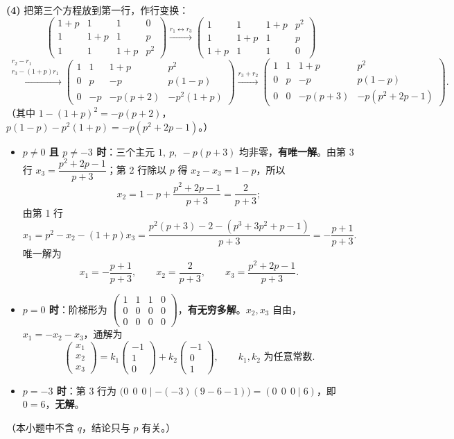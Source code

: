 \documentclass[11pt,a4paper]{ctexart}
\newcommand{\rt}[1]{\xrightarrow{#1}}
\begin{document}
\textbf{(4)} 把第三个方程放到第一行，作行变换：
\[
\left(\begin{array}{ccc|c}1+p&1&1&0\\1&1+p&1&p\\1&1&1+p&p^2\end{array}\right)
\rt{r_1\leftrightarrow r_3}
\left(\begin{array}{ccc|c}1&1&1+p&p^2\\1&1+p&1&p\\1+p&1&1&0\end{array}\right)
\]
\[
\rt{\substack{r_2-r_1\\ r_3-(1+p)r_1}}
\left(\begin{array}{ccc|c}1&1&1+p&p^2\\0&p&-p&p(1-p)\\0&-p&-p(p+2)&-p^2(1+p)\end{array}\right)
\rt{r_3+r_2}
\left(\begin{array}{ccc|c}1&1&1+p&p^2\\0&p&-p&p(1-p)\\0&0&-p(p+3)&-p(p^2+2p-1)\end{array}\right).
\]
（其中 $1-(1+p)^2=-p(p+2)$，$p(1-p)-p^2(1+p)=-p(p^2+2p-1)$。）
\begin{itemize}
  \item \textbf{$p\ne0$ 且 $p\ne-3$ 时}：三个主元 $1,\ p,\ -p(p+3)$ 均非零，\textbf{有唯一解}。由第 3 行 $x_3=\dfrac{p^2+2p-1}{p+3}$；第 2 行除以 $p$ 得 $x_2-x_3=1-p$，所以
  \[
  x_2=1-p+\frac{p^2+2p-1}{p+3}=\frac{2}{p+3};
  \]
  由第 1 行
  \[
  x_1=p^2-x_2-(1+p)x_3=\frac{p^2(p+3)-2-(p^3+3p^2+p-1)}{p+3}=-\frac{p+1}{p+3}.
  \]
  唯一解为
  \[
  x_1=-\frac{p+1}{p+3},\qquad x_2=\frac{2}{p+3},\qquad x_3=\frac{p^2+2p-1}{p+3}.
  \]
  \item \textbf{$p=0$ 时}：阶梯形为 $\left(\begin{array}{ccc|c}1&1&1&0\\0&0&0&0\\0&0&0&0\end{array}\right)$，\textbf{有无穷多解}。$x_2,x_3$ 自由，$x_1=-x_2-x_3$，通解为
  \[
  \begin{pmatrix}x_1\\x_2\\x_3\end{pmatrix}
  =k_1\begin{pmatrix}-1\\1\\0\end{pmatrix}+k_2\begin{pmatrix}-1\\0\\1\end{pmatrix},\qquad k_1,k_2\text{ 为任意常数}.
  \]
  \item \textbf{$p=-3$ 时}：第 3 行为 $\bigl(0\ \ 0\ \ 0\mid -(-3)(9-6-1)\bigr)=(0\ \ 0\ \ 0\mid 6)$，即 $0=6$，\textbf{无解}。
\end{itemize}
（本小题中不含 $q$，结论只与 $p$ 有关。）
\end{document}
